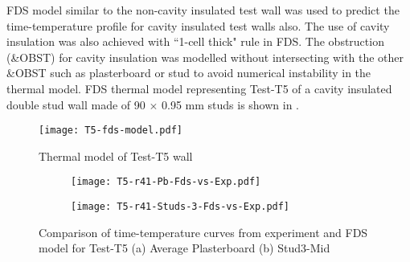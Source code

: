 FDS model similar to the non-cavity insulated test wall was used to predict the time-temperature profile for cavity insulated test walls also. The use of cavity insulation was also achieved with ``1-cell thick" rule in FDS. The obstruction (\&OBST) for cavity insulation was modelled without intersecting with the other \&OBST such as plasterboard or stud to avoid numerical instability in the thermal model. FDS thermal model representing Test-T5 of a cavity insulated double stud wall made of 90 $\times$ 0.95 mm studs is shown in .
\begin{figure}[!htbp]
	\centering
		\texttt{[image: T5-fds-model.pdf]}
		\caption{Thermal model of Test-T5 wall}
		\label{fig:T5-fds-model-cavity}
\end{figure}
\begin{figure}[!htbp]
	\centering
	\begin{subfigure}[b]{0.7\textwidth}
		\centering
		\texttt{[image: T5-r41-Pb-Fds-vs-Exp.pdf]}
		\caption{}
		\label{subfig:T5-r41-Pb-Fds-vs-Exp}
	\end{subfigure}
	\begin{subfigure}[b]{0.6\textwidth}
		\centering
		\texttt{[image: T5-r41-Studs-3-Fds-vs-Exp.pdf]}
		\caption{}
		\label{subfig:T5-r41-Studs-3-Fds-vs-Exp}
	\end{subfigure}
	   \caption{Comparison of time-temperature curves from experiment and FDS model for Test-T5 (a) Average Plasterboard (b) Stud3-Mid}
	   \label{fig:fds-output-pb-studs-t5}
\end{figure}

